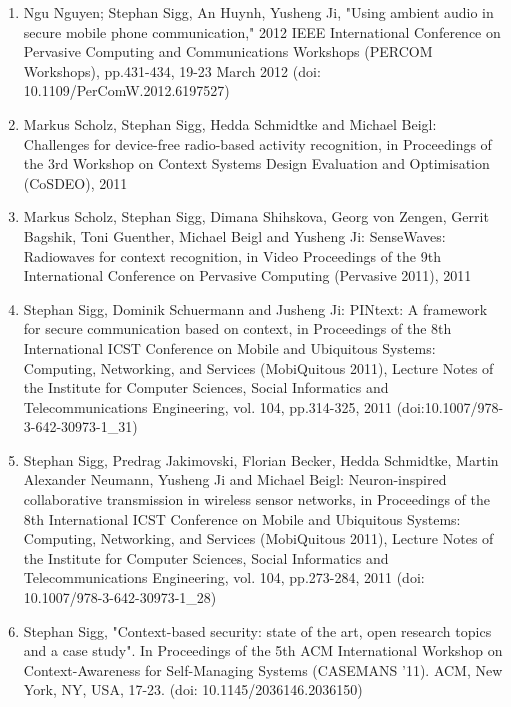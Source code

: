 \documentclass[12pt]{article}
\newcounter{saveenumi}
\begin{document}
\begin{enumerate}
\setcounter{enumi}{\value{saveenumi}}
\item Ngu Nguyen; Stephan Sigg, An Huynh, Yusheng Ji, "Using ambient audio in secure mobile phone communication," 2012 IEEE International Conference on Pervasive Computing and Communications Workshops (PERCOM Workshops), pp.431-434, 19-23 March 2012 (doi: 10.1109/PerComW.2012.6197527)
\item Markus Scholz, Stephan Sigg, Hedda Schmidtke and Michael Beigl: Challenges for device-free radio-based activity recognition, in Proceedings of the 3rd Workshop on Context Systems Design Evaluation and Optimisation (CoSDEO), 2011
\item Markus Scholz, Stephan Sigg, Dimana Shihskova, Georg von Zengen, Gerrit Bagshik, Toni Guenther, Michael Beigl and Yusheng Ji: SenseWaves: Radiowaves for context recognition, in Video Proceedings of the 9th International Conference on Pervasive Computing (Pervasive 2011), 2011
\item Stephan Sigg, Dominik Schuermann and Jusheng Ji: PINtext: A framework for secure communication based on context, in Proceedings of the 8th International ICST Conference on Mobile and Ubiquitous Systems: Computing, Networking, and Services (MobiQuitous 2011), Lecture Notes of the Institute for Computer Sciences, Social Informatics and Telecommunications Engineering, vol. 104, pp.314-325, 2011 (doi:10.1007/978-3-642-30973-1\_31)
\item Stephan Sigg, Predrag Jakimovski, Florian Becker, Hedda Schmidtke, Martin Alexander Neumann, Yusheng Ji and Michael Beigl: Neuron-inspired collaborative transmission in wireless sensor networks, in Proceedings of the 8th International ICST Conference on Mobile and Ubiquitous Systems: Computing, Networking, and Services (MobiQuitous 2011), Lecture Notes of the Institute for Computer Sciences, Social Informatics and Telecommunications Engineering, vol. 104, pp.273-284, 2011 (doi: 10.1007/978-3-642-30973-1\_28)
\item Stephan Sigg, "Context-based security: state of the art, open research topics and a case study". In Proceedings of the 5th ACM International Workshop on Context-Awareness for Self-Managing Systems (CASEMANS '11). 	ACM, New York, NY, USA, 17-23. (doi: 10.1145/2036146.2036150) 

\end{enumerate}
\end{document}
